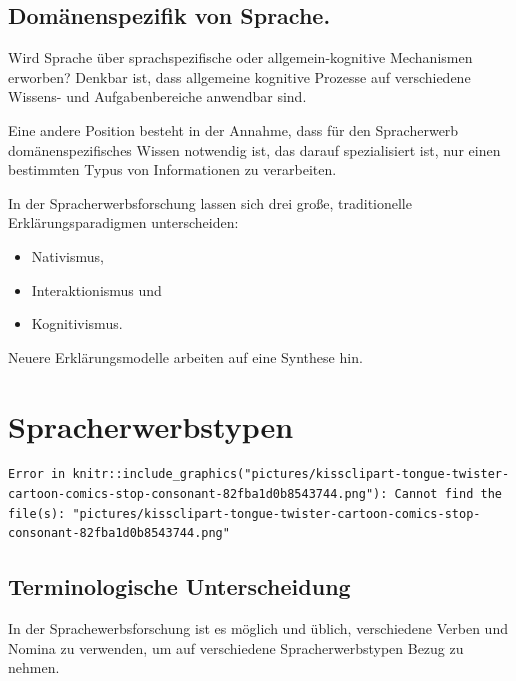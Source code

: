 \documentclass[
  letterpaper,
]{scrbook}
\providecommand{\tightlist}{%
  \setlength{\itemsep}{0pt}\setlength{\parskip}{0pt}}\usepackage{longtable,booktabs,array}
\begin{document}
\hypertarget{domuxe4nenspezifik-von-sprache.}{%
\section{Domänenspezifik von
Sprache.}\label{domuxe4nenspezifik-von-sprache.}}

Wird Sprache über sprachspezifische oder allgemein-kognitive Mechanismen
erworben? Denkbar ist, dass allgemeine kognitive Prozesse auf
verschiedene Wissens- und Aufgabenbereiche anwendbar sind.

Eine andere Position besteht in der Annahme, dass für den Spracherwerb
domänenspezifisches Wissen notwendig ist, das darauf spezialisiert ist,
nur einen bestimmten Typus von Informationen zu verarbeiten.

In der Spracherwerbsforschung lassen sich drei große, traditionelle
Erklärungsparadigmen unterscheiden:

\begin{itemize}
\tightlist
\item
  Nativismus,
\item
  Interaktionismus und
\item
  Kognitivismus.
\end{itemize}

Neuere Erklärungsmodelle arbeiten auf eine Synthese hin.

\hypertarget{sec-zungenbrecher}{%
\chapter{Spracherwerbstypen}\label{sec-zungenbrecher}}

\begin{verbatim}
Error in knitr::include_graphics("pictures/kissclipart-tongue-twister-cartoon-comics-stop-consonant-82fba1d0b8543744.png"): Cannot find the file(s): "pictures/kissclipart-tongue-twister-cartoon-comics-stop-consonant-82fba1d0b8543744.png"
\end{verbatim}

\hypertarget{terminologische-unterscheidung}{%
\section{Terminologische
Unterscheidung}\label{terminologische-unterscheidung}}

In der Sprachewerbsforschung ist es möglich und üblich, verschiedene
Verben und Nomina zu verwenden, um auf verschiedene Spracherwerbstypen
Bezug zu nehmen.
\end{document}
